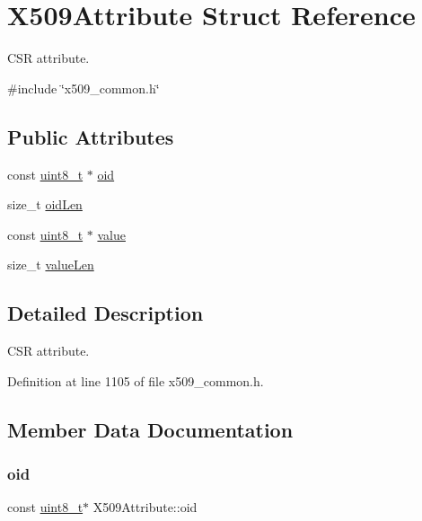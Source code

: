 \hypertarget{structX509Attribute}{}\section{X509\+Attribute Struct Reference}
\label{structX509Attribute}


C\+SR attribute.  




{\ttfamily \#include \char`\"{}x509\+\_\+common.\+h\char`\"{}}

\subsection*{Public Attributes}
\begin{DoxyCompactItemize}
\item 
const \hyperlink{stdint_8h_aba7bc1797add20fe3efdf37ced1182c5}{uint8\+\_\+t} $\ast$ \hyperlink{structX509Attribute_adef93e94f9e831bb8d8d5e2ad1fe3693}{oid}
\item 
size\+\_\+t \hyperlink{structX509Attribute_ac03ef355131a4835e1350f9da7819ca5}{oid\+Len}
\item 
const \hyperlink{stdint_8h_aba7bc1797add20fe3efdf37ced1182c5}{uint8\+\_\+t} $\ast$ \hyperlink{structX509Attribute_a4285683a21f1b17553c16d2372f9ea97}{value}
\item 
size\+\_\+t \hyperlink{structX509Attribute_a27cbb916c6731d4c1c26e48d95ba1f0c}{value\+Len}
\end{DoxyCompactItemize}


\subsection{Detailed Description}
C\+SR attribute. 

Definition at line 1105 of file x509\+\_\+common.\+h.



\subsection{Member Data Documentation}
\mbox{\label{structX509Attribute_adef93e94f9e831bb8d8d5e2ad1fe3693}} 
\subsubsection{\texorpdfstring{oid}{oid}}
{\footnotesize\ttfamily const \hyperlink{stdint_8h_aba7bc1797add20fe3efdf37ced1182c5}{uint8\+\_\+t}$\ast$ X509\+Attribute\+::oid}




